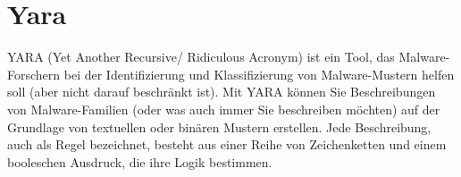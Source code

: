 

\section{Yara}
YARA (Yet Another Recursive/ Ridiculous Acronym) ist ein Tool, das Malware-Forschern bei der Identifizierung und Klassifizierung von Malware-Mustern helfen soll (aber nicht darauf beschränkt ist). Mit YARA können Sie Beschreibungen von Malware-Familien (oder was auch immer Sie beschreiben möchten) auf der Grundlage von textuellen oder binären Mustern erstellen. Jede Beschreibung, auch als Regel bezeichnet, besteht aus einer Reihe von Zeichenketten und einem booleschen Ausdruck, die ihre Logik bestimmen.


